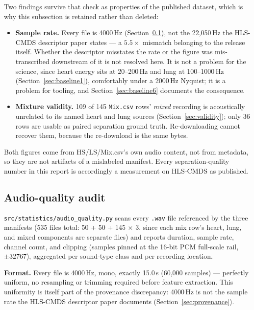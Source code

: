 \documentclass[11pt]{article}
\begin{document}
Two findings survive that check as properties of the published dataset, which
is why this subsection is retained rather than deleted:

\begin{itemize}
  \item \textbf{Sample rate.} Every file is 4000\,Hz
    (Section~\ref{sec:audioquality}), not the 22{,}050\,Hz the HLS-CMDS
    descriptor paper states --- a $5.5\times$ mismatch belonging to the
    release itself. Whether the descriptor misstates the rate or the figure
    was mis-transcribed downstream of it is not resolved here. It is not a
    problem for the science, since heart energy sits at 20--200\,Hz and lung
    at 100--1000\,Hz (Section~\ref{sec:baseline1}), comfortably under a
    2000\,Hz Nyquist; it is a problem for tooling, and
    Section~\ref{sec:baseline6} documents the consequence.
  \item \textbf{Mixture validity.} 109 of 145 \texttt{Mix.csv} rows'
    \emph{mixed} recording is acoustically unrelated to its named heart and
    lung sources (Section~\ref{sec:validity}); only 36 rows are usable as
    paired separation ground truth. Re-downloading cannot recover them,
    because the re-download is the same bytes.
\end{itemize}

Both figures come from HS/LS/Mix.csv's own audio content, not from metadata,
so they are not artifacts of a mislabeled manifest. Every
separation-quality number in this report is accordingly a measurement on
HLS-CMDS as published.

\subsection{Audio-quality audit}
\label{sec:audioquality}

\texttt{src/statistics/audio\_quality.py} scans every \texttt{.wav} file
referenced by the three manifests (535 files total: 50 + 50 + 145
$\times$ 3, since each mix row's heart, lung, and mixed components are
separate files) and reports duration, sample rate, channel count, and
clipping (samples pinned at the 16-bit PCM full-scale rail,
$\pm 32767$), aggregated per sound-type class and per recording location.

\textbf{Format.} Every file is 4000\,Hz, mono, exactly 15.0\,s
(60{,}000 samples) --- perfectly uniform, no resampling or trimming
required before feature extraction. This uniformity is itself part of the
provenance discrepancy: 4000\,Hz is not the sample rate the HLS-CMDS
descriptor paper documents (Section~\ref{sec:provenance}).
\end{document}
